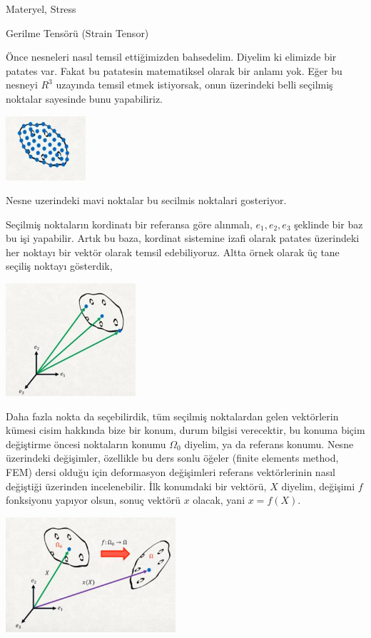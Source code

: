 \documentclass[12pt,fleqn]{article}\usepackage{../../common}
\begin{document}
Materyel, Stress

Gerilme Tensörü (Strain Tensor) 

Önce nesneleri nasıl temsil ettiğimizden bahsedelim. Diyelim ki elimizde bir
patates var. Fakat bu patatesin matematiksel olarak bir anlamı yok. Eğer
bu nesneyi $R^3$ uzayında temsil etmek istiyorsak, onun üzerindeki belli
seçilmiş noktalar sayesinde bunu yapabiliriz.

\includegraphics[width=8em]{phy_020_strs_01_01.jpg}

Nesne uzerindeki mavi noktalar bu secilmis noktalari gosteriyor.

Seçilmiş noktaların kordinatı bir referansa göre alınmalı, $e_1,e_2,e_3$
şeklinde bir baz bu işi yapabilir. Artık bu baza, kordinat sistemine izafi
olarak patates üzerindeki her noktayı bir vektör olarak temsil edebiliyoruz.
Altta örnek olarak üç tane seçiliş noktayı gösterdik,

\includegraphics[width=13em]{phy_020_strs_01_02.jpg}

Daha fazla nokta da seçebilirdik, tüm seçilmiş noktalardan gelen vektörlerin
kümesi cisim hakkında bize bir konum, durum bilgisi verecektir, bu konuma biçim
değiştirme öncesi noktaların konumu $\Omega_0$ diyelim, ya da referans konumu.
Nesne üzerindeki değişimler, özellikle bu ders sonlu öğeler (finite elements
method, FEM) dersi olduğu için deformasyon değişimleri referans vektörlerinin
nasıl değiştiği üzerinden incelenebilir. İlk konumdaki bir vektörü, $X$ diyelim,
değişimi $f$ fonksiyonu yapıyor olsun, sonuç vektörü $x$ olacak, yani $x =
f(X)$.

\includegraphics[width=17em]{phy_020_strs_01_03.jpg}
\end{document}
